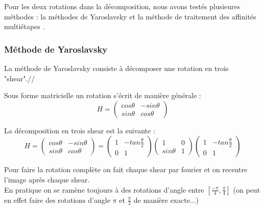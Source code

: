 
Pour les deux rotations dans la décomposition, nous avons testés plusieures méthodes : la méthodes de Yaroslavsky \cite{unser1995convolution} et la méthode de traitement des affinités multiétapes \cite{szeliski2010high}.

\subsubsection{Méthode de Yaroslavsky}

La méthode de Yaroslavsky consiste à décomposer une rotation en trois "shear".//

Sous forme matricielle un rotation s'écrit de manière générale :
\begin{equation*}
	H=\begin{pmatrix}
	cos \theta&-sin \theta\\sin \theta&cos \theta
	\end{pmatrix}
	\end{equation*}

La décomposition en trois shear est la suivante :
\begin{equation*}
	H=\begin{pmatrix}
	cos \theta&-sin \theta\\sin \theta&cos \theta
	\end{pmatrix}=\begin{pmatrix}
	1&-tan \frac{\theta}{2}\\0&1
	\end{pmatrix}\begin{pmatrix}
	1&0\\sin \theta&1
	\end{pmatrix}\begin{pmatrix}
	1&-tan \frac{\theta}{2}\\0&1
	\end{pmatrix}
	\end{equation*}

	Pour faire la rotation complète on fait chaque shear par fourier et on recentre l'image après chaque shear.\\
	En pratique on se ramène toujours à des rotations d'angle entre $[\frac{-\pi}{4},\frac{\pi}{4}]$ (on peut en effet faire des rotations d'angle $\pi$ et $\frac{\pi}{2}$ de manière exacte...)  

